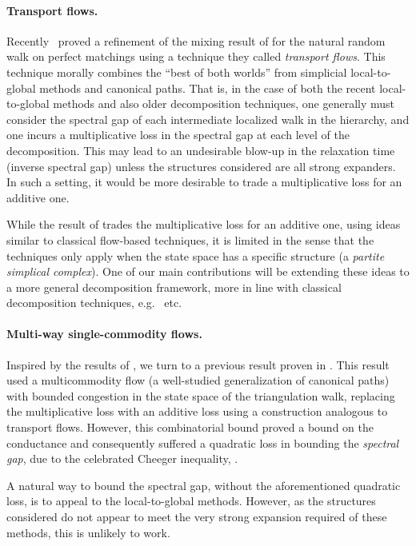 \documentclass[a4paper, 12p]{article}
\numberwithin{equation}{section}
\begin{document}
\paragraph{Transport flows.}
Recently~\cite{weimingjs} proved a refinement of the mixing result of \cite{jerrum1989approximating} for the natural random walk on perfect matchings using a technique they called \emph{transport flows}. This technique morally combines the ``best of both worlds'' from simplicial local-to-global methods and canonical paths. That is, in the case of both the recent local-to-global methods and also older decomposition techniques, one generally must consider the spectral gap of each intermediate localized walk in the hierarchy, and one incurs a multiplicative loss in the spectral gap at each level of the decomposition. This may lead to an undesirable blow-up in the relaxation time (inverse spectral gap) unless the structures considered are all strong expanders. In such a setting, it would be more desirable to trade a multiplicative loss for an additive one.   

While the result of \cite{weimingjs} trades the multiplicative loss for an additive one, using ideas similar to classical flow-based techniques, it is limited in the sense that the techniques only apply when the state space has a specific structure (a \emph{partite simplical complex}). One of our main contributions will be extending these ideas to a more general decomposition framework, more in line with classical decomposition techniques, e.g.~\cite{jstv} etc. 

\paragraph{Multi-way single-commodity flows.}
Inspired by the results of \cite{weimingjs}, we turn to a previous result proven in
\cite{eppstein2022improved}. This result used a multicommodity flow (a well-studied generalization of canonical paths) with bounded congestion in the state space of the triangulation walk, replacing the multiplicative loss with an additive loss using a construction analogous to transport flows. However, this combinatorial bound proved a bound on the conductance and consequently suffered a quadratic loss in bounding the \emph{spectral gap}, due to the celebrated Cheeger inequality, \cite{cheeger1, cheeger2}. 

A natural way to bound the spectral gap, without the aforementioned quadratic loss, is to appeal to the local-to-global methods. However, as the structures considered do not appear to meet the very strong expansion required of these methods, this is unlikely to work. 
\end{document}
